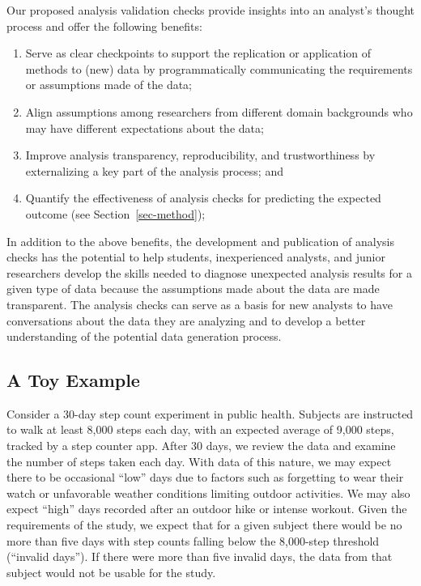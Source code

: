 \documentclass[
  12pt,
]{interact}
\providecommand{\tightlist}{%
  \setlength{\itemsep}{0pt}\setlength{\parskip}{0pt}}\usepackage{longtable,booktabs,array}
\begin{document}
Our proposed analysis validation checks provide insights into an
analyst's thought process and offer the following benefits:

\begin{enumerate}
\def\labelenumi{\arabic{enumi}.}
\tightlist
\item
  Serve as clear checkpoints to support the replication or application
  of methods to (new) data by programmatically communicating the
  requirements or assumptions made of the data;
\item
  Align assumptions among researchers from different domain backgrounds
  who may have different expectations about the data;
\item
  Improve analysis transparency, reproducibility, and trustworthiness by
  externalizing a key part of the analysis process; and
\item
  Quantify the effectiveness of analysis checks for predicting the
  expected outcome (see Section~\ref{sec-method});
\end{enumerate}

In addition to the above benefits, the development and publication of
analysis checks has the potential to help students, inexperienced
analysts, and junior researchers develop the skills needed to diagnose
unexpected analysis results for a given type of data because the
assumptions made about the data are made transparent. The analysis
checks can serve as a basis for new analysts to have conversations about
the data they are analyzing and to develop a better understanding of the
potential data generation process.

\subsection{A Toy Example}\label{sec-toy}

Consider a 30-day step count experiment in public health. Subjects are
instructed to walk at least 8,000 steps each day, with an expected
average of 9,000 steps, tracked by a step counter app. After 30 days, we
review the data and examine the number of steps taken each day. With
data of this nature, we may expect there to be occasional ``low'' days
due to factors such as forgetting to wear their watch or unfavorable
weather conditions limiting outdoor activities. We may also expect
``high'' days recorded after an outdoor hike or intense workout. Given
the requirements of the study, we expect that for a given subject there
would be no more than five days with step counts falling below the
8,000-step threshold (``invalid days''). If there were more than five
invalid days, the data from that subject would not be usable for the
study.
\end{document}
